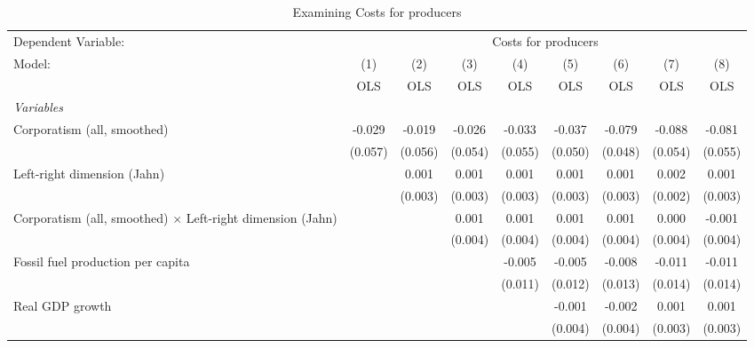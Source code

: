 
\begin{table}[htbp]
   \caption{Examining Costs for producers}
   \centering
   \begin{tabular}{lcccccccc}
      \toprule
      Dependent Variable: & \multicolumn{8}{c}{Costs for producers}\\
      Model:                                                            & (1)     & (2)     & (3)     & (4)     & (5)     & (6)     & (7)     & (8)\\  
                                                                        &  OLS    & OLS     & OLS     & OLS     & OLS     & OLS     & OLS     & OLS\\  
      \midrule
      \emph{Variables}\\
      Corporatism (all, smoothed)                                       & -0.029  & -0.019  & -0.026  & -0.033  & -0.037  & -0.079  & -0.088  & -0.081\\   
                                                                        & (0.057) & (0.056) & (0.054) & (0.055) & (0.050) & (0.048) & (0.054) & (0.055)\\   
      Left-right dimension (Jahn)                                       &         & 0.001   & 0.001   & 0.001   & 0.001   & 0.001   & 0.002   & 0.001\\   
                                                                        &         & (0.003) & (0.003) & (0.003) & (0.003) & (0.003) & (0.002) & (0.003)\\   
      Corporatism (all, smoothed) $\times$ Left-right dimension (Jahn)  &         &         & 0.001   & 0.001   & 0.001   & 0.001   & 0.000   & -0.001\\   
                                                                        &         &         & (0.004) & (0.004) & (0.004) & (0.004) & (0.004) & (0.004)\\   
      Fossil fuel production per capita                                 &         &         &         & -0.005  & -0.005  & -0.008  & -0.011  & -0.011\\   
                                                                        &         &         &         & (0.011) & (0.012) & (0.013) & (0.014) & (0.014)\\   
      Real GDP growth                                                   &         &         &         &         & -0.001  & -0.002  & 0.001   & 0.001\\   
                                                                        &         &         &         &         & (0.004) & (0.004) & (0.003) & (0.003)\\   

\end{tabular}
\end{table}
